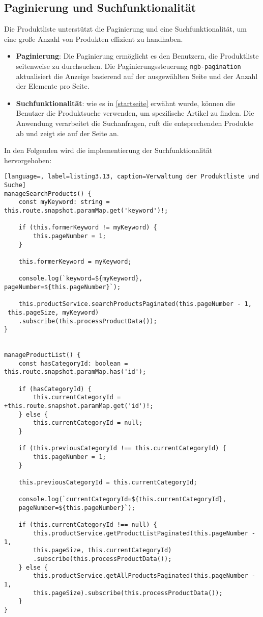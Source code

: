 \subsection{Paginierung und Suchfunktionalität}

Die Produktliste unterstützt die Paginierung und eine Suchfunktionalität, um eine große Anzahl von Produkten effizient zu handhaben.

\begin{itemize}
	\item \textbf{Paginierung}: Die Paginierung ermöglicht es den Benutzern, die Produktliste seitenweise zu durchsuchen. Die Paginierungssteuerung \verb*|ngb-pagination| aktualisiert die Anzeige basierend auf der ausgewählten Seite und der Anzahl der Elemente pro Seite.
	\item \textbf{Suchfunktionalität}: wie es in \ref{startseite} erwähnt wurde, können die Benutzer die Produktsuche verwenden, um spezifische Artikel zu finden. Die Anwendung verarbeitet die Suchanfragen, ruft die entsprechenden Produkte ab und zeigt sie auf der Seite an.
\end{itemize}

\newpage
In den Folgenden wird die implementierung der Suchfunktionalität hervorgehoben: 

\begin{lstlisting}[language=, label=listing3.13, caption=Verwaltung der Produktliste und Suche]
manageSearchProducts() {
	const myKeyword: string = this.route.snapshot.paramMap.get('keyword')!;
	
	if (this.formerKeyword != myKeyword) {
		this.pageNumber = 1;
	}
	
	this.formerKeyword = myKeyword;
	
	console.log(`keyword=${myKeyword}, pageNumber=${this.pageNumber}`);

	this.productService.searchProductsPaginated(this.pageNumber - 1,
 this.pageSize, myKeyword)
	.subscribe(this.processProductData());
}


manageProductList() {
	const hasCategoryId: boolean = this.route.snapshot.paramMap.has('id');
	
	if (hasCategoryId) {
		this.currentCategoryId = +this.route.snapshot.paramMap.get('id')!;
	} else {
		this.currentCategoryId = null;
	}
	
	if (this.previousCategoryId !== this.currentCategoryId) {
		this.pageNumber = 1;
	}
	
	this.previousCategoryId = this.currentCategoryId;
	
	console.log(`currentCategoryId=${this.currentCategoryId}, 
	pageNumber=${this.pageNumber}`);
	
	if (this.currentCategoryId !== null) {
		this.productService.getProductListPaginated(this.pageNumber - 1, 
		this.pageSize, this.currentCategoryId)
		.subscribe(this.processProductData());
	} else {
		this.productService.getAllProductsPaginated(this.pageNumber - 1, 
		this.pageSize).subscribe(this.processProductData());
	}
}
\end{lstlisting}

